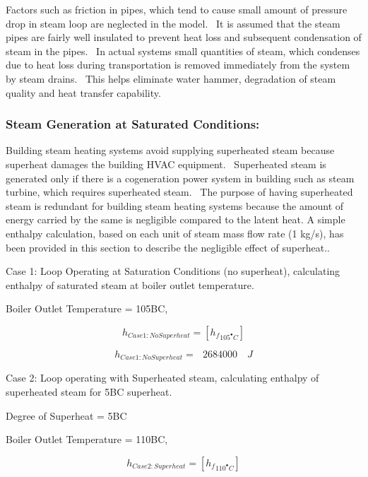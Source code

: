 Factors such as friction in pipes, which tend to cause small amount of pressure drop in steam loop are neglected in the model.~ It is assumed that the steam pipes are fairly well insulated to prevent heat loss and subsequent condensation of steam in the pipes.~ In actual systems small quantities of steam, which condenses due to heat loss during transportation is removed immediately from the system by steam drains.~ This helps eliminate water hammer, degradation of steam quality and heat transfer capability.

\subsubsection{Steam Generation at Saturated Conditions:}\label{steam-generation-at-saturated-conditions}

Building steam heating systems avoid supplying superheated steam because superheat damages the building HVAC equipment.~ Superheated steam is generated only if there is a cogeneration power system in building such as steam turbine, which requires superheated steam.~ The purpose of having superheated steam is redundant for building steam heating systems because the amount of energy carried by the same is negligible compared to the latent heat. A simple enthalpy calculation, based on each unit of steam mass flow rate (1 kg/s), has been provided in this section to describe the negligible effect of superheat..

Case 1: Loop Operating at Saturation Conditions (no superheat), calculating enthalpy of saturated steam at boiler outlet temperature.

Boiler Outlet Temperature = 105BC,

\begin{equation}
{h_{Case1:NoSuperheat}} = [{h_f}_{{{105}^ \bullet }C}]
\end{equation}

\begin{equation}
{h_{Case1:NoSuperheat}} = \,\,\,\,2684000\,\,\,\,\,\,J
\end{equation}

Case 2: Loop operating with Superheated steam, calculating enthalpy of superheated steam for 5BC superheat.

Degree of Superheat = 5BC

Boiler Outlet Temperature = 110BC,

\begin{equation}
{h_{Case2:Superheat}} = [{h_f}_{{{110}^ \bullet }C}]
\end{equation}

